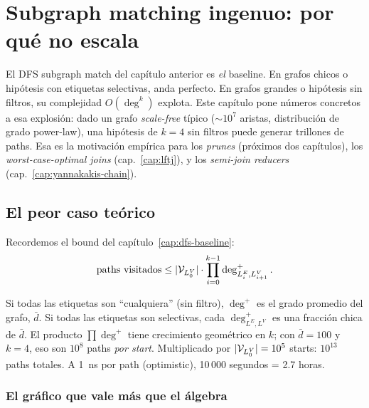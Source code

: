 \chapter{Subgraph matching ingenuo: por qué no escala}
\label{cap:naive-matching}

\begin{intuicion}
El DFS subgraph match del capítulo anterior es \emph{el} baseline.
En grafos chicos o hipótesis con etiquetas selectivas, anda
perfecto. En grafos grandes o hipótesis sin filtros, su complejidad
\(O(\deg^k)\) explota. Este capítulo pone números concretos a esa
explosión: dado un grafo \emph{scale-free} típico (\(\sim 10^7\)
aristas, distribución de grado power-law), una hipótesis de \(k=4\)
sin filtros puede generar trillones de paths. Esa es la motivación
empírica para los \emph{prunes} (próximos dos capítulos), los
\emph{worst-case-optimal joins} (cap.~\ref{cap:lftj}), y los
\emph{semi-join reducers} (cap.~\ref{cap:yannakakis-chain}).
\end{intuicion}

\section{El peor caso teórico}

Recordemos el bound del capítulo~\ref{cap:dfs-baseline}:
\[
\text{paths visitados} \leq |\mathcal{V}_{L_0^V}| \cdot \prod_{i=0}^{k-1} \deg^{+}_{L_i^E, L_{i+1}^V}.
\]

\noindent
Si todas las etiquetas son ``cualquiera'' (sin filtro), \(\deg^{+}\)
es el grado promedio del grafo, \(\bar{d}\). Si todas las
etiquetas son selectivas, cada \(\deg^{+}_{L^E, L^V}\) es una
fracción chica de \(\bar{d}\). El producto \(\prod \deg^{+}\) tiene
crecimiento geométrico en \(k\); con \(\bar{d} = 100\) y \(k = 4\),
eso son \(10^8\) paths \emph{por start}. Multiplicado por
\(|\mathcal{V}_{L_0^V}| = 10^5\) starts: \(10^{13}\) paths totales. A 1~ns
por path (optimistic), 10\,000 segundos = 2.7 horas.

\subsection{El gráfico que vale más que el álgebra}

